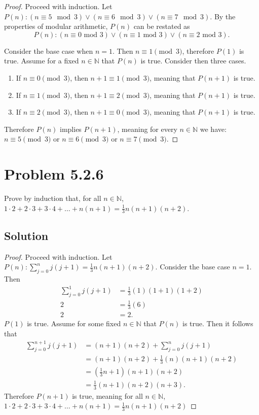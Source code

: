 \documentclass[12pt]{extarticle}
\begin{document}
\begin{proof}
	Proceed with induction. Let $P(n): (n \equiv 5 \mod{3}) \lor (n \equiv 6 \mod{3}) \lor (n \equiv 7 \mod{3})$. By the properties of modular arithmetic, $P(n)$ can be restated as
	\[
		P(n): (n \equiv 0\text{ mod }3 ) \lor (n \equiv 1 \text{ mod }3) \lor (n \equiv 2 \text{ mod }3)
	.\]

	Consider the base case when $n=1$. Then $n \equiv 1 \pmod{3}$, therefore $P(1)$ is true. Assume for a fixed $n \in \mathbb{N}$ that $P(n)$ is true. Consider then three cases.

	\begin{enumerate}[leftmargin=1cm]
		\item If $n \equiv 0 \pmod{3}$, then $n + 1 \equiv 1 \pmod{3}$, meaning that $P(n+1)$ is true.
		\item If $n \equiv 1 \pmod{3}$, then $n + 1 \equiv 2 \pmod{3}$, meaning that $P(n+1)$ is true.
		\item If $n \equiv 2 \pmod{3}$, then $n + 1 \equiv 0 \pmod{3}$, meaning that $P(n+1)$ is true.
	\end{enumerate}

	Therefore $P(n)$ implies $P(n+1)$, meaning for every $n \in \mathbb{N}$ we have: $n \equiv 5 \pmod{3}$ or $n \equiv 6 \pmod{3}$ or $n \equiv 7 \pmod{3}$.
\end{proof}

\section*{Problem 5.2.6}

Prove by induction that, for all $n \in \mathbb{N}$, $1\cdot 2+2\cdot 3+3\cdot 4+\ldots +n(n+1) = \frac{1}{3} n(n+1)(n+2)$.

\subsection*{Solution}

\begin{proof}
	Proceed with induction. Let $P(n): \displaystyle\sum_{j=0}^{n} j(j+1) = \frac{1}{3} n (n+1) (n+2)$. Consider the base case $n=1$. Then
	\begin{align*}
		\sum_{j=0}^{1} j(j+1) &= \frac{1}{3} (1) (1+1) (1+2) \\
		2 &= \frac{1}{3} (6) \\
		2 &= 2
	.\end{align*} $P(1)$ is true. Assume for some fixed $n \in \mathbb{N}$ that $P(n)$ is true. Then it follows that
	\begin{align*}
		\sum_{j=0}^{n+1} j(j+1) &= (n+1)(n+2) + \sum_{j=0}^{n} j(j+1) \\
									 &= (n+1)(n+2) + \frac{1}{3} (n) (n+1) (n+2) \\
									 &= (\frac{1}{3} n + 1) (n + 1) (n + 2) \\
									 &= \frac{1}{3} (n + 1) (n + 2) (n + 3)
	.\end{align*}
	Therefore $P(n+1)$ is true, meaning for all $n \in \mathbb{N}$, $1\cdot 2+2\cdot 3+3\cdot 4+\ldots +n(n+1) = \frac{1}{3} n(n+1)(n+2)$
\end{proof}
\end{document}
